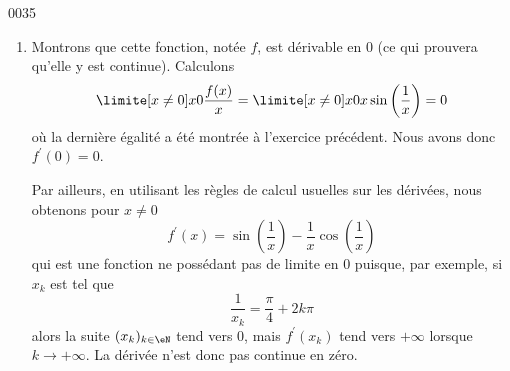 \begin{corrige}{0035}
\begin{enumerate}
\item
Montrons que cette fonction, notée $f$, est
dérivable en $0$ (ce qui prouvera qu'elle y est continue). Calculons
\begin{equation*}
  \limite[x \neq 0] x 0 \frac{f(x)}{x} = \limite[x\neq 0] x 0 x \sin
  \left(
    \frac 1 x
  \right) = 0
\end{equation*}
où la dernière égalité a été montrée à l'exercice précédent. Nous
avons donc $f^\prime(0) = 0$.

Par ailleurs, en utilisant les règles de calcul usuelles sur les
dérivées, nous obtenons pour $x \neq 0$
\begin{equation*}
  f^\prime(x) = \sin
  \left(
    \frac 1 x
  \right) - \frac 1 x \cos
  \left(
    \frac 1 x
  \right)
\end{equation*}
qui est une fonction ne possédant pas de limite en $0$ puisque, par exemple,
si $x_k$ est tel que
\begin{equation*}
  \frac 1{x_k} = \frac\pi4 + 2k\pi
\end{equation*}
alors la suite $(x_k)_{k\in\eN}$ tend vers $0$, mais $f^\prime(x_k)$ tend vers $+\infty$ lorsque $k \rightarrow +\infty$. La dérivée n'est donc pas continue en zéro.

\end{enumerate}

\end{corrige}
